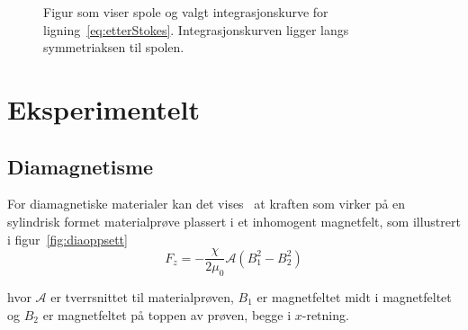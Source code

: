 \documentclass[a4paper,11pt, twocolumn]{article}
\begin{document}
\begin{figure}[!ht]
	\centering

	\caption{Figur som viser spole og valgt integrasjonskurve for ligning~\ref{eq:etterStokes}. Integrasjonskurven ligger langs symmetriaksen til spolen.} 
	\label{fig:spole}
\end{figure}

\section{Eksperimentelt}
\subsection{Diamagnetisme}
For diamagnetiske materialer kan det vises~\cite{oppgavesett} at kraften som virker på en sylindrisk formet materialprøve plassert i et inhomogent magnetfelt, som illustrert i figur~\ref{fig:diaoppsett} 
\begin{equation}
	F_z = -\frac{\chi}{2\mu_0}\mathcal{A}(B_1^2-B_2^2)
	\label{eq:dia}
\end{equation}

hvor $\mathcal{A}$ er tverrsnittet til materialprøven, $B_1$ er magnetfeltet midt i magnetfeltet og $B_2$ er magnetfeltet på toppen av prøven, begge i $x$-retning.
\end{document}
